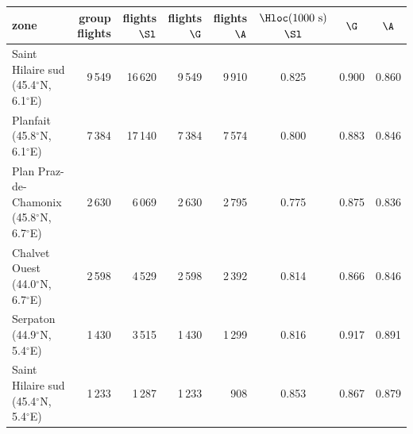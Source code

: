 \begin{tabular}{@{}l r r r r c c c@{}}
\toprule
zone & group flights & flights $\Sl$ & flights $\G$ & flights $\A$ & $\Hloc(1000~\mathrm{s})$ $\Sl$ & $\G$ & $\A$ \\
\midrule
Saint Hilaire sud (45.4$^\circ$N, 6.1$^\circ$E) & 9\,549 & 16\,620 & 9\,549 & 9\,910 & 0.825 & 0.900 & 0.860 \\
Planfait (45.8$^\circ$N, 6.1$^\circ$E) & 7\,384 & 17\,140 & 7\,384 & 7\,574 & 0.800 & 0.883 & 0.846 \\
Plan Praz-de-Chamonix (45.8$^\circ$N, 6.7$^\circ$E) & 2\,630 & 6\,069 & 2\,630 & 2\,795 & 0.775 & 0.875 & 0.836 \\
Chalvet Ouest (44.0$^\circ$N, 6.7$^\circ$E) & 2\,598 & 4\,529 & 2\,598 & 2\,392 & 0.814 & 0.866 & 0.846 \\
Serpaton (44.9$^\circ$N, 5.4$^\circ$E) & 1\,430 & 3\,515 & 1\,430 & 1\,299 & 0.816 & 0.917 & 0.891 \\
Saint Hilaire sud (45.4$^\circ$N, 5.4$^\circ$E) & 1\,233 & 1\,287 & 1\,233 & 908 & 0.853 & 0.867 & 0.879 \\
\bottomrule
\end{tabular}
